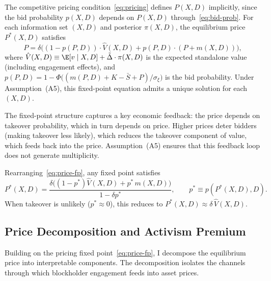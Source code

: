 The competitive pricing condition~\eqref{eq:pricing} defines $P(X,D)$ implicitly, since the bid probability $p(X,D)$ depends on $P(X,D)$ through~\eqref{eq:bid-prob}. For each information set $(X,D)$ and posterior $\pi(X,D)$, the equilibrium price $P^*(X,D)$ satisfies
\begin{equation}
P = \delta\Big((1-p(P,D)) \cdot \hat{V}(X,D) + p(P,D) \cdot (P + m(X,D))\Big),
\label{eq:price-fp}
\end{equation}
where $\hat{V}(X,D) \equiv \E[v \mid X,D] + \tilde{\Delta} \cdot \pi(X,D)$ is the expected standalone value (including engagement effects), and $p(P,D) = 1 - \Phi\big((m(P,D) + K - \bar{S} + P)/\sigma_\xi\big)$ is the bid probability. Under Assumption~\textup{(A5)}, this fixed-point equation admits a unique solution for each $(X,D)$.

The fixed-point structure captures a key economic feedback: the price depends on takeover probability, which in turn depends on price. Higher prices deter bidders (making takeover less likely), which reduces the takeover component of value, which feeds back into the price. Assumption~\textup{(A5)} ensures that this feedback loop does not generate multiplicity.

Rearranging~\eqref{eq:price-fp}, any fixed point satisfies
\[
P^*(X,D)=\frac{\delta\big((1-p^*)\hat{V}(X,D)+p^*\,m(X,D)\big)}{1-\delta p^*},
\qquad p^*\equiv p(P^*(X,D),D).
\]
When takeover is unlikely ($p^*\approx 0$), this reduces to $P^*(X,D)\approx \delta\,\hat{V}(X,D)$.

\subsection{Price Decomposition and Activism Premium}

Building on the pricing fixed point~\eqref{eq:price-fp}, I decompose the equilibrium price into interpretable components. The decomposition isolates the channels through which blockholder engagement feeds into asset prices.


